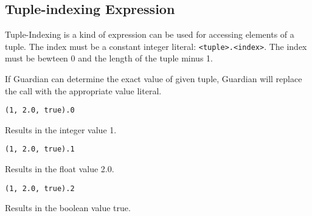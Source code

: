 
\subsection{Tuple-indexing Expression}
{
	Tuple-Indexing is a kind of expression can be used for accessing elements
	of a tuple. The index must be a constant integer
	literal: \texttt{<tuple>.<index>}.
	The index must be bewteen 0 and the length of the tuple minus 1.
	
	If Guardian can determine the exact value of given tuple, Guardian
	will replace the call with the appropriate value literal.
	
	\begin{itemize}
	{
		\item \texttt{(1, 2.0, true).0}
		
			Results in the integer value 1.
			
		\item \texttt{(1, 2.0, true).1}
		
			Results in the float value 2.0.
			
		\item \texttt{(1, 2.0, true).2}
		
			Results in the boolean value true.
	}
	\end{itemize}
}
